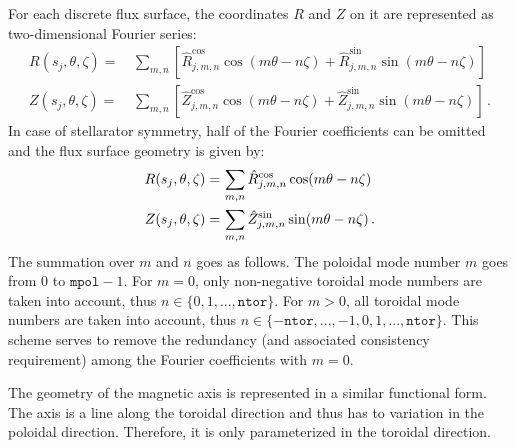 For each discrete flux surface, the coordinates $R$ and $Z$ on it are represented as two-dimensional Fourier series:
\begin{align}
 R(s_j, \theta, \zeta) =&\, \sum\limits_{m, n}
   \left[ \hat{R}_{j, m, n}^{\cos} \cos(m \theta - n \zeta) +
          \hat{R}_{j, m, n}^{\sin} \sin(m \theta - n \zeta) \right] \label{eqn:r_full} \\
 Z(s_j, \theta, \zeta) =&\, \sum\limits_{m, n}
   \left[ \hat{Z}_{j, m, n}^{\cos} \cos(m \theta - n \zeta) +
          \hat{Z}_{j, m, n}^{\sin} \sin(m \theta - n \zeta) \right] \label{eqn:z_full} \, .
\end{align}
In case of stellarator symmetry, half of the Fourier coefficients can be omitted
and the flux surface geometry is given by:
\begin{align}
 R(s_j, \theta, \zeta) =&\, \sum\limits_{m, n}
   \hat{R}_{j, m, n}^{\cos} \cos(m \theta - n \zeta) \label{eqn:r_symm} \\
 Z(s_j, \theta, \zeta) =&\, \sum\limits_{m, n}
   \hat{Z}_{j, m, n}^{\sin} \sin(m \theta - n \zeta) \textsl{}\label{eqn:z_symm} \, .
\end{align}
The summation over $m$ and $n$ goes as follows.
The poloidal mode number $m$ goes from $0$ to $\texttt{mpol} - 1$.
For $m = 0$, only non-negative toroidal mode numbers are taken into account,
thus $n \in \{0, 1, ..., \texttt{ntor}\}$.
For $m > 0$, all toroidal mode numbers are taken into account,
thus $n \in \{-\texttt{ntor}, ..., -1, 0, 1, ..., \texttt{ntor}\}$.
This scheme serves to remove the redundancy (and associated consistency requirement) among the Fourier coefficients with $m = 0$.

The geometry of the magnetic axis is represented in a similar functional form.
The axis is a line along the toroidal direction and thus has to variation in the poloidal direction.
Therefore, it is only parameterized in the toroidal direction.

